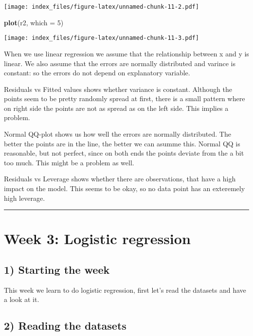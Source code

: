 \documentclass[]{article}
\newenvironment{Shaded}{\begin{snugshade}}{\end{snugshade}}
\newcommand{\KeywordTok}[1]{\textcolor[rgb]{0.13,0.29,0.53}{\textbf{#1}}}
\newcommand{\DataTypeTok}[1]{\textcolor[rgb]{0.13,0.29,0.53}{#1}}
\newcommand{\DecValTok}[1]{\textcolor[rgb]{0.00,0.00,0.81}{#1}}
\newcommand{\NormalTok}[1]{#1}
\begin{document}
\texttt{[image: index\_files/figure-latex/unnamed-chunk-11-2.pdf]}

\begin{Shaded}
\begin{Highlighting}[]
\KeywordTok{plot}\NormalTok{(r2, }\DataTypeTok{which =} \DecValTok{5}\NormalTok{)}
\end{Highlighting}
\end{Shaded}

\texttt{[image: index\_files/figure-latex/unnamed-chunk-11-3.pdf]}

When we use linear regression we assume that the relationship between x
and y is linear. We also assume that the errors are normally distributed
and varince is constant: so the errors do not depend on explanatory
variable.

Residuals vs Fitted values shows whether variance is constant. Although
the points seem to be pretty randomly spread at first, there is a small
pattern where on right side the points are not as spread as on the left
side. This implies a problem.

Normal QQ-plot shows us how well the errors are normally distributed.
The better the points are in the line, the better we can asumme this.
Normal QQ is reasonable, but not perfect, since on both ends the points
deviate from the a bit too much. This might be a problem as well.

Residuals vs Leverage shows whether there are observations, that have a
high impact on the model. This seems to be okay, so no data point has an
exteremely high leverage.

\begin{center}\rule{0.5\linewidth}{\linethickness}\end{center}

\section{Week 3: Logistic regression}\label{week-3-logistic-regression}

\subsection{1) Starting the week}\label{starting-the-week}

This week we learn to do logistic regression, first let's read the
datasets and have a look at it.

\subsection{2) Reading the datasets}\label{reading-the-datasets}
\end{document}
